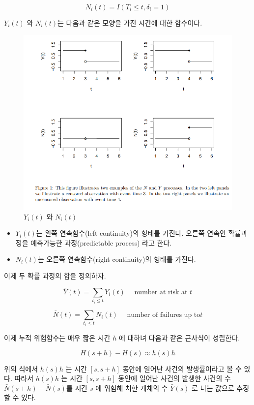 \documentclass[
]{book}
\providecommand{\tightlist}{%
  \setlength{\itemsep}{0pt}\setlength{\parskip}{0pt}}
\theoremstyle{definition}
\theoremstyle{definition}
\theoremstyle{definition}
\theoremstyle{definition}
\theoremstyle{remark}
\begin{document}
\[ N_i(t) = I(T_i \le t, \delta_i=1) \]

\(Y_i(t)\) 와 \(N_i(t)\)는 다음과 같은 모양을 가진 시간에 대한 함수이다.

\begin{figure}
\centering
\includegraphics{images/process.PNG}
\caption{\(Y_i(t)\) 와 \(N_i(t)\)}
\end{figure}

\begin{itemize}
\tightlist
\item
  \(Y_i(t)\)는 왼쪽 연속함수(left continuity)의 형태를 가진다. 오른쪽 연속인 확률과정을 예측가능한 과정(predictable process) 라고 한다.
\item
  \(N_i(t)\)는 오른쪽 연속함수(right continuity)의 형태를 가진다.
\end{itemize}

이제 두 확률 과정의 합을 정의하자.

\[ \bar Y(t) =\sum_{t_i \le t} Y_i(t)  \quad \text{  number at risk at } t\]

\[ \bar N(t) =\sum_{t_i \le t} N_i(t)  \quad \text{  number of failures up to} t\]

이제 누적 위험함수는 매우 짧은 시간 \(h\) 에 대하녀 다음과 같은 근사식이 성립한다.

\[ H(s+h) - H(s) \approx h(s) h \]

위의 식에서 \(h(s)h\) 는 시간 \([s, s+h]\) 동안에 일어난 사건의 발생률이라고 볼 수 있다. 따라서 \(h(s)h\) 는 시간 \([s, s+h]\) 동안에 일어난 사건의 발생한 사건의
수 \(\bar N(s+h) -\bar N(s)\)를 시간 \(s\) 에 위험해 처한 개채의 수 \(\bar Y(s)\) 로 나는 값으로 추정할 수 있다.
\end{document}
